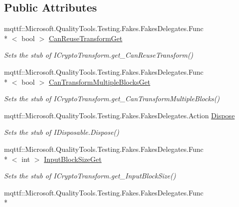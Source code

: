 \subsection*{Public Attributes}
\begin{DoxyCompactItemize}
\item 
mqttf\-::\-Microsoft.\-Quality\-Tools.\-Testing.\-Fakes.\-Fakes\-Delegates.\-Func\\*
$<$ bool $>$ \hyperlink{class_system_1_1_security_1_1_cryptography_1_1_fakes_1_1_stub_i_crypto_transform_a25f8d274d6cb932b4c506e7bb1cc348c}{Can\-Reuse\-Transform\-Get}
\begin{DoxyCompactList}\small\item\em Sets the stub of I\-Crypto\-Transform.\-get\-\_\-\-Can\-Reuse\-Transform()\end{DoxyCompactList}\item 
mqttf\-::\-Microsoft.\-Quality\-Tools.\-Testing.\-Fakes.\-Fakes\-Delegates.\-Func\\*
$<$ bool $>$ \hyperlink{class_system_1_1_security_1_1_cryptography_1_1_fakes_1_1_stub_i_crypto_transform_a1327b80fbc2d8cf6d233da1205f1c817}{Can\-Transform\-Multiple\-Blocks\-Get}
\begin{DoxyCompactList}\small\item\em Sets the stub of I\-Crypto\-Transform.\-get\-\_\-\-Can\-Transform\-Multiple\-Blocks()\end{DoxyCompactList}\item 
mqttf\-::\-Microsoft.\-Quality\-Tools.\-Testing.\-Fakes.\-Fakes\-Delegates.\-Action \hyperlink{class_system_1_1_security_1_1_cryptography_1_1_fakes_1_1_stub_i_crypto_transform_a889065305f5e6d655a599359f998aefb}{Dispose}
\begin{DoxyCompactList}\small\item\em Sets the stub of I\-Disposable.\-Dispose()\end{DoxyCompactList}\item 
mqttf\-::\-Microsoft.\-Quality\-Tools.\-Testing.\-Fakes.\-Fakes\-Delegates.\-Func\\*
$<$ int $>$ \hyperlink{class_system_1_1_security_1_1_cryptography_1_1_fakes_1_1_stub_i_crypto_transform_a19a7dd3cbb673174ae9569fbf19161d8}{Input\-Block\-Size\-Get}
\begin{DoxyCompactList}\small\item\em Sets the stub of I\-Crypto\-Transform.\-get\-\_\-\-Input\-Block\-Size()\end{DoxyCompactList}\item 
mqttf\-::\-Microsoft.\-Quality\-Tools.\-Testing.\-Fakes.\-Fakes\-Delegates.\-Func\\*

\end{DoxyCompactItemize}
